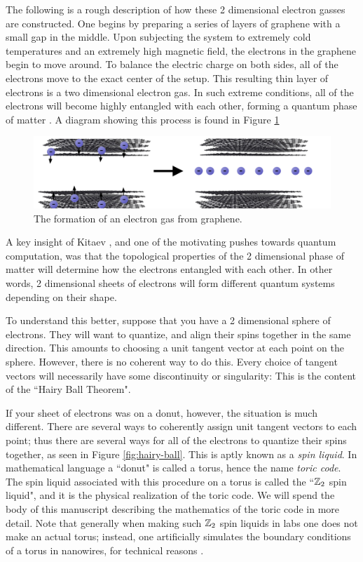 \documentclass{article}
\theoremstyle{definition}
\numberwithin{figure}{section}
\begin{document}
The following is a rough description of how these 2 dimensional electron gasses are constructed. One begins by preparing a series of layers of graphene with a small gap in the middle. Upon subjecting the system to extremely cold temperatures and an extremely high magnetic field, the electrons in the graphene begin to move around. To balance the electric charge on both sides, all of the electrons move to the exact center of the setup. This resulting thin layer of electrons is a two dimensional electron gas. In such extreme conditions, all of the electrons will become highly entangled with each other, forming a quantum phase of matter \cite{yang2021experimental}. A diagram showing this process is found in Figure \ref{fig:spin-liquid}

\begin{figure}
\begin{center}
\includegraphics[scale=0.30]{spin-liquid}
\caption{The formation of an electron gas from graphene.}
\label{fig:spin-liquid}
\end{center}
\end{figure}

A key insight of Kitaev \cite{kitaev2003fault}, and one of the motivating pushes towards quantum computation, was that the topological properties of the 2 dimensional phase of matter will determine how the electrons entangled with each other. In other words, 2 dimensional sheets of electrons will form different quantum systems depending on their shape.

To understand this better, suppose that you have a 2 dimensional sphere of electrons. They will want to quantize, and align their spins together in the same direction. This amounts to choosing a unit tangent vector at each point on the sphere. However, there is no coherent way to do this. Every choice of tangent vectors will necessarily have some discontinuity or singularity: This is the content of the ``Hairy Ball Theorem".

If your sheet of electrons was on a donut, however, the situation is much different. There are several ways to coherently assign unit tangent vectors to each point; thus there are several ways for all of the electrons to quantize their spins together, as seen in Figure \ref{fig:hairy-ball}. This is aptly known as a \textit{spin liquid}. In mathematical language a ``donut" is called a torus, hence the name \textit{toric code}. The spin liquid associated with this procedure on a torus is called the ``$\mathbb{Z}_2$ spin liquid", and it is the physical realization of the toric code. We will spend the body of this manuscript describing the mathematics of the toric code in more detail. Note that generally when making such $\mathbb{Z}_2$ spin liquids in labs one does not make an actual torus; instead, one artificially simulates the boundary conditions of a torus in nanowires, for technical reasons \cite{albrecht2016exponential, mourik2012signatures}.
\end{document}

